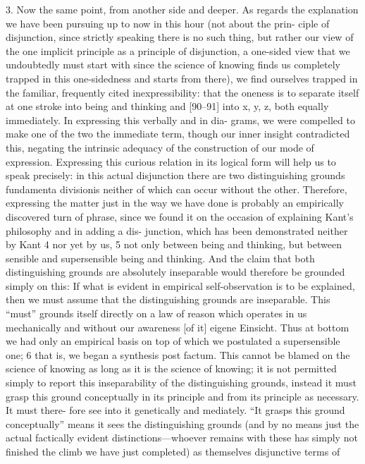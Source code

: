 3. Now the same point, from another side and deeper.
As regards the explanation we have been pursuing up to now in this hour (not about the prin-
ciple of disjunction, since strictly speaking there is no such thing, but rather our
view of the one implicit principle as a principle of disjunction, a one-sided
view that we undoubtedly must start with since the science of knowing finds
us completely trapped in this one-sidedness and starts from there), we find
ourselves trapped in the familiar, frequently cited inexpressibility: that the
oneness is to separate itself at one stroke into being and thinking and [90–91]
into x, y, z, both equally immediately.
In expressing this verbally and in dia-
grams, we were compelled to make one of the two the immediate term,
though our inner insight contradicted this, negating the intrinsic adequacy of
the construction of our mode of expression.
Expressing this curious relation in
its logical form will help us to speak precisely: in this actual disjunction there
are two distinguishing grounds {fundamenta divisionis} neither of which can
occur without the other.
Therefore, expressing the matter just in the way we
have done is probably an empirically discovered turn of phrase, since we
found it on the occasion of explaining Kant’s philosophy and in adding a dis-
junction, which has been demonstrated neither by Kant 4 nor yet by us, 5 not
only between being and thinking, but between sensible and supersensible
being and thinking.
And the claim that both distinguishing grounds are
absolutely inseparable would therefore be grounded simply on this: If what is
evident in empirical self-observation is to be explained, then we must assume
that the distinguishing grounds are inseparable.
This “must” grounds itself
directly on a law of reason which operates in us mechanically and without our
awareness [of it] {eigene Einsicht}.
Thus at bottom we had only an empirical
basis on top of which we postulated a supersensible one; 6 that is, we began a
synthesis post factum.
This cannot be blamed on the science of knowing as
long as it is the science of knowing; it is not permitted simply to report this
inseparability of the distinguishing grounds, instead it must grasp this ground
conceptually in its principle and from its principle as necessary.
It must there-
fore see into it genetically and mediately.
“It grasps this ground conceptually”
means it sees the distinguishing grounds (and by no means just the actual
factically evident distinctions—whoever remains with these has simply not
finished the climb we have just completed) as themselves disjunctive terms of
